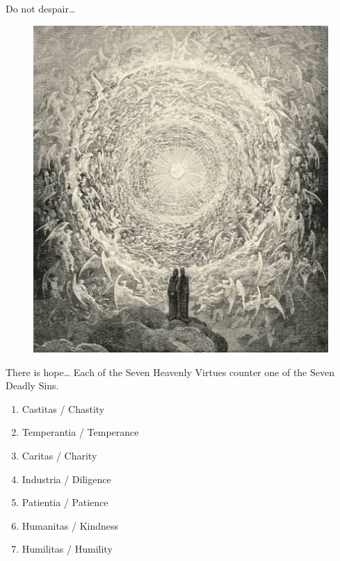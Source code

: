 \documentclass[12pt,xcolor=x11names]{beamer}
\begin{document}
\begin{frame}{Do not despair\ldots}
    \begin{figure}
        \centering \includegraphics[height=0.75\textheight]{hope.jpg}
    \end{figure}
\end{frame}

\begin{frame}{There is hope\ldots}
    Each of the Seven Heavenly Virtues counter one of the Seven Deadly Sins.
    \begin{enumerate}
        \item Castitas / Chastity
        \item Temperantia / Temperance
        \item Caritas / Charity
        \item Industria / Diligence
        \item Patientia / Patience
        \item Humanitas / Kindness
        \item Humilitas / Humility
    \end{enumerate}
\end{frame}
\end{document}
